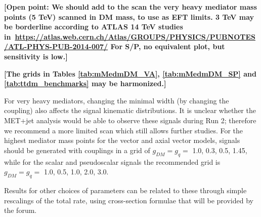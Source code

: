 \documentclass[a4,debug,notitlepage,nobib]{tufte-handout}
\begin{document}
\textbf{[Open point: We should add to the scan 
the very heavy mediator mass points (5 TeV) scanned in DM mass, to use as EFT limits.  
3 TeV may be borderline according to ATLAS 14 TeV studies 
in~\url{https://atlas.web.cern.ch/Atlas/GROUPS/PHYSICS/PUBNOTES/ATL-PHYS-PUB-2014-007/}
For S/P, no equivalent plot, but sensitivity is low.]}




\textbf{[The grids in Tables \ref{tab:mMedmDM_VA}, \ref{tab:mMedmDM_SP} and 
\ref{tab:ttdm_benchmarks} may be harmonized.]}

For very heavy mediators, changing
the minimal width (by changing the coupling) also affects the signal
kinematic distributions. It is unclear whether the MET+jet analysis
would be able to observe these signals during Run 2; therefore we
recommend a more limited scan which still allows further studies.
For the highest mediator mass points for the vector and axial vector models, 
signals should be generated with couplings in a grid of $g_{DM} = g_{q} = $ 1.0, 0.3, 0.5, 1.45,
while for the scalar and pseudoscalar signals the recommended grid is
$g_{DM} = g_{q} = $ 1.0, 0.5, 1.0, 2.0, 3.0.





Results for other choices of parameters can be related to
these through simple rescalings of the total rate, using cross-section
formulae that will be provided by the forum.
\end{document}
